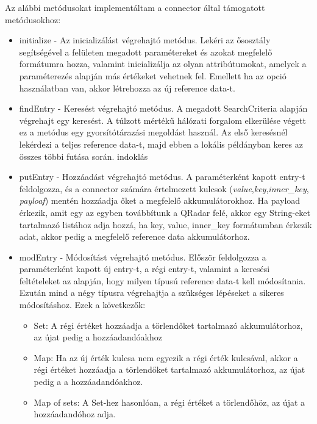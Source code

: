 Az alábbi metódusokat implementáltam a connector által támogatott metódusokhoz:

\begin{itemize}
	\item initialize - Az inicializálást végrehajtó metódus. Lekéri az ősosztály segítségével a felületen megadott paramétereket és azokat megfelelő formátumra hozza, valamint inicializálja az olyan attribútumokat, amelyek a paraméterezés alapján más értékeket vehetnek fel. Emellett ha az opció használatban van, akkor létrehozza az új reference data-t.
	
	\item findEntry - Keresést végrehajtó metódus. A megadott SearchCriteria alapján végrehajt egy keresést. A túlzott mértékű hálózati forgalom elkerülése végett ez a metódus egy gyorsítótárazási megoldást használ. Az első keresésnél lekérdezi a teljes reference data-t, majd ebben a lokális példányban keres az összes többi futása során. \todo indoklás
	
	\item  putEntry - Hozzáadást végrehajtó metódus. A paraméterként kapott entry-t feldolgozza, és a connector számára értelmezett kulcsok (\textit{value},\textit{key},\textit{inner\_key}, \textit{payloaf}) mentén hozzáadja őket a megfelelő akkumulátorokhoz. Ha payload érkezik, amit egy az egyben továbbítunk a QRadar felé, akkor egy String-eket tartalmazó listához adja hozzá, ha key, value, inner\_key formátumban érkezik adat, akkor pedig a megfelelő reference data akkumulátorhoz.
	
	\item modEntry - Módosítást végrehajtó metódus. Először feldolgozza a paraméterként kapott új entry-t, a régi entry-t, valamint a keresési feltételeket az alapján, hogy milyen típusú reference data-t kell módosítania. Ezután mind a négy típusra végrehajtja a szükséges lépéseket a sikeres módosításhoz. Ezek a következők:
	\begin{itemize}
		\item Set: A régi értéket hozzáadja a törlendőket tartalmazó akkumulátorhoz, az újat pedig a hozzáadandóakhoz
		
		\item Map: Ha az új érték kulcsa nem egyezik a régi érték kulcsával, akkor a régi értéket hozzáadja a törlendőket tartalmazó akkumulátorhoz, az újat pedig a a hozzáadandóakhoz.
		
		\item Map of sets: A Set-hez hasonlóan, a régi értéket a törlendőhöz, az újat a hozzáadandóhoz adja.
		

\end{itemize}
\end{itemize}
